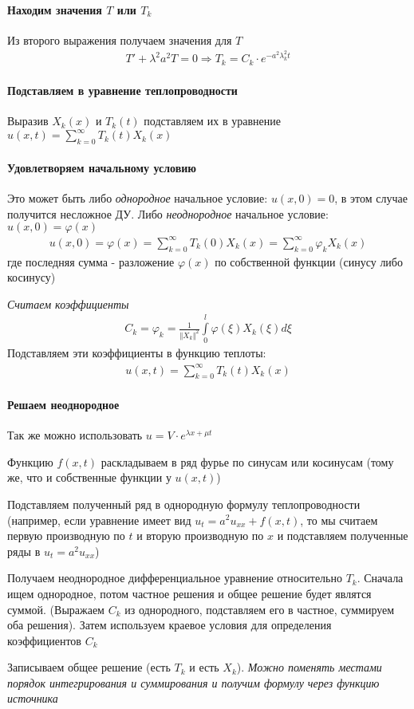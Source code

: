 \documentclass{article}[12pt]
\begin{document}
\paragraph{Находим значения $T$ или $T_{k}$}
Из второго выражения получаем значения для $T$
\begin{eqnarray*}
    T'+\lambda^{2}a^{2}T=0 \Rightarrow
    T_{k}=C_{k}\cdot e^{-a^{2}\lambda_{k}^{2}t}
\end{eqnarray*}

\paragraph{Подставляем в уравнение теплопроводности}
Выразив $X_{k}(x)$ и $T_{k}(t)$ подставляем их в уравнение
$u(x,t)=\sum\limits_{k=0}^{\infty}T_{k}(t)X_{k}(x)$

\paragraph{Удовлетворяем начальному условию}
Это может быть либо \textit{однородное} начальное условие: $u(x,0)=0$, в этом
случае получится несложное ДУ. Либо \textit{неоднородное} начальное условие:
$u(x,0)=\varphi(x)$
\begin{eqnarray*}
    u(x,0)=\varphi(x)=\sum\limits_{k=0}^{\infty}T_{k}(0)X_{k}(x)
    =\sum\limits_{k=0}^{\infty}\varphi_{k}X_{k}(x)
\end{eqnarray*}
где последняя сумма - разложение $\varphi(x)$ по собственной функции
(синусу либо косинусу)
\par \textit{Считаем коэффициенты}
\begin{eqnarray*}
    C_{k}=\varphi_{k}=\frac{1}{\Vert X_{k} \Vert^{2}}\int\limits_{0}^{l}
    \varphi(\xi)X_{k}(\xi)d\xi
\end{eqnarray*}
Подставляем эти коэффициенты в функцию теплоты:
\begin{eqnarray*}
    u(x,t)=\sum\limits_{k=0}^{\infty}T_{k}(t)X_{k}(x)
\end{eqnarray*}


\paragraph{Решаем неоднородное}
Так же можно использовать $u=V\cdot e^{\lambda x+\mu t}$
\par Функцию $f(x,t)$ раскладываем в ряд фурье по синусам или косинусам (тому
же, что и собственные функции у $u(x,t)$)
\par Подставляем полученный ряд в однородную формулу теплопроводности
(например, если уравнение имеет вид $u_{t}=a^{2}u_{xx}+f(x,t)$, то мы
считаем первую производную по $t$ и вторую производную по $x$ и
подставляем полученные ряды в $u_{t}=a^{2}u_{xx}$)
\par Получаем неоднородное дифференциальное уравнение относительно
$T_{k}$. Сначала ищем однородное, потом частное решения и общее решение
будет являтся суммой. (Выражаем $C_{k}$ из однородного, подставляем его
в частное, суммируем оба решения). Затем используем краевое условия для
определения коэффициентов $C_{k}$
\par Записываем общее решение (есть $T_{k}$ и есть $X_{k}$).
\textit{Можно поменять местами порядок интегрирования и суммирования и
получим формулу через функцию источника}
\end{document}
